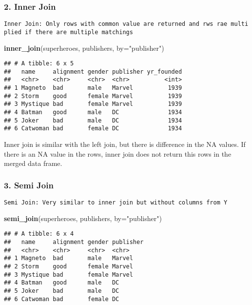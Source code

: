 \documentclass[
]{article}
\newenvironment{Shaded}{\begin{snugshade}}{\end{snugshade}}
\newcommand{\DataTypeTok}[1]{\textcolor[rgb]{0.13,0.29,0.53}{#1}}
\newcommand{\KeywordTok}[1]{\textcolor[rgb]{0.13,0.29,0.53}{\textbf{#1}}}
\newcommand{\NormalTok}[1]{#1}
\newcommand{\StringTok}[1]{\textcolor[rgb]{0.31,0.60,0.02}{#1}}
\begin{document}
\hypertarget{inner-join}{%
\subsubsection{2. Inner Join}\label{inner-join}}

\texttt{Inner\ Join:\ Only\ rows\ with\ common\ value\ are\ returned\ and\ rws\ rae\ multiplied\ if\ there\ are\ multiple\ matchings}

\begin{Shaded}
\begin{Highlighting}[]
\KeywordTok{inner\_join}\NormalTok{(superheroes, publishers, }\DataTypeTok{by=}\StringTok{"publisher"}\NormalTok{)}
\end{Highlighting}
\end{Shaded}

\begin{verbatim}
## # A tibble: 6 x 5
##   name     alignment gender publisher yr_founded
##   <chr>    <chr>     <chr>  <chr>          <int>
## 1 Magneto  bad       male   Marvel          1939
## 2 Storm    good      female Marvel          1939
## 3 Mystique bad       female Marvel          1939
## 4 Batman   good      male   DC              1934
## 5 Joker    bad       male   DC              1934
## 6 Catwoman bad       female DC              1934
\end{verbatim}

Inner join is similar with the left join, but there is difference in the
NA values. If there is an NA value in the rows, inner join does not
return this rows in the merged data frame.

\hypertarget{semi-join}{%
\subsubsection{3. Semi Join}\label{semi-join}}

\texttt{Semi\ Join:\ Very\ similar\ to\ inner\ join\ but\ without\ columns\ from\ Y}

\begin{Shaded}
\begin{Highlighting}[]
\KeywordTok{semi\_join}\NormalTok{(superheroes, publishers, }\DataTypeTok{by=}\StringTok{"publisher"}\NormalTok{)}
\end{Highlighting}
\end{Shaded}

\begin{verbatim}
## # A tibble: 6 x 4
##   name     alignment gender publisher
##   <chr>    <chr>     <chr>  <chr>    
## 1 Magneto  bad       male   Marvel   
## 2 Storm    good      female Marvel   
## 3 Mystique bad       female Marvel   
## 4 Batman   good      male   DC       
## 5 Joker    bad       male   DC       
## 6 Catwoman bad       female DC
\end{verbatim}
\end{document}

